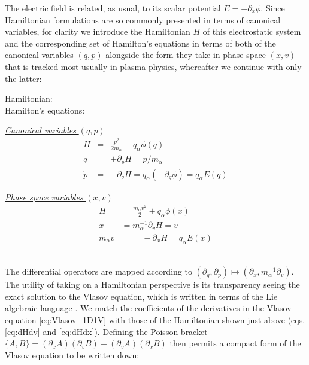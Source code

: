 \documentclass[11pt,titlepage]{report}
\begin{document}
\noindent The electric field is related, as usual, to its scalar potential $E = -\partial_x \phi$. Since Hamiltonian formulations are so commonly presented in terms of canonical variables, for clarity we introduce the Hamiltonian $H$ of this electrostatic system and the corresponding set of Hamilton's equations in terms of both of the canonical variables $(q,p)$ alongside the form they take in phase space $(x,v)$ that is tracked most usually in plasma physics, whereafter we continue with only the latter:\\[1em]
\begin{minipage}{0.21\textwidth}
\phantom{\ldots}
\phantom{\ldots}
Hamiltonian: \\[2.5em]
Hamilton's equations:
\end{minipage}
\begin{minipage}{0.38\textwidth}
\hspace{2.6em}\underline{\emph{Canonical variables} $(q,p)$}\\\vspace{-1em}
\begin{eqnarray*}
H & = & \frac{p^2}{2m_{\alpha}} + q_{\alpha}\phi(q)\\[1em]
\dot{q} &=& +\partial_p H = p/m_{\alpha} \\
\dot{p} &=& -\partial_q H = q_{\alpha}(-\partial_q\phi) = q_{\alpha}E(q)
\end{eqnarray*}
\end{minipage}
\begin{minipage}{0.34\textwidth}
\hspace{2em}
\underline{\emph{Phase space variables} $(x,v)$}\\\vspace{-1em}
\begin{subequations}
\begin{align}
H  &=  \frac{m_{\alpha}v^2}{2} + q_{\alpha}\phi(x) \label{eq:Hamiltonian_xv}\\[1em]
\dot{x} &= m_{\alpha}^{-1}\partial_vH = v \label{eq:dHdv}\\
m_{\alpha}\dot{v} & = \,\,\,\,\,\,\,-\partial_x H = q_{\alpha}E(x)\label{eq:dHdx}
\end{align}
\end{subequations}
\end{minipage}\\[1em]

\noindent The differential operators are mapped according to $(\partial_q,\partial_p) \mapsto (\partial_x, m_{\alpha}^{-1}\partial_v)$. The utility of taking on a Hamiltonian perspective is its transparency seeing the exact solution to the Vlasov equation, which is written in terms of the Lie algebraic language \cite{Neri87}. We match the coefficients of the derivatives in the Vlasov equation \eqref{eq:Vlasov_1D1V} with those of the Hamiltonian shown just above (eqs. \eqref{eq:dHdv} and \eqref{eq:dHdx}). Defining the Poisson bracket $\{A,B\} = (\partial_xA)(\partial_vB) - (\partial_vA)(\partial_xB)$ then permits a compact form of the Vlasov equation to be written down:
\end{document}
